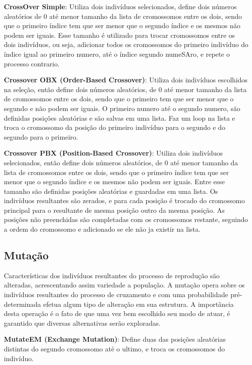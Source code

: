 \textbf{CrossOver Simple}: Utiliza dois indivíduos selecionados,  define dois números aleatórios de 0 até menor tamanho da lista de cromossomos entre os dois, 
sendo que o primeiro índice tem que ser menor que o segundo índice e os mesmos não podem ser iguais. 
Esse tamanho é utilizado para trocar cromossomos entre os dois indivíduos, ou seja, adicionar todos os cromossomos do primeiro indivíduo do índice 
igual ao primeiro numero, até o índice segundo numeSAro, e repete o processo contrario.

\textbf{Crossover OBX (Order-Based Crossover)}: Utiliza dois indivíduos escolhidos na seleção, então define dois números aleatórios, de 0 até menor tamanho da lista de cromossomos entre os dois, sendo que o primeiro tem que ser menor que o segundo e não podem ser iguais. O primeiro numero até o segundo numero, são definidas posições aleatórias e são salvas em uma lista. Faz um loop na lista e troca o cromossomo da posição do primeiro indivíduo para o segundo e do segundo para o primeiro.

\textbf{Crossover PBX (Position-Based Crossover)}: Utiliza dois indivíduos selecionados, então define dois números aleatórios, 
de 0 até menor tamanho da lista de cromossomos entre os dois, sendo que o primeiro índice tem que ser menor que o segundo índice e os mesmos não podem ser iguais. 
Entre esse tamanho são definidas posições aleatórias e guardadas em uma lista. Os indivíduos resultantes são zerados, 
e para cada posição é trocado do cromossomo principal para o resultante de mesma posição outro da mesma posição. 
As posições não preenchidas são completadas com os cromossomos restante, seguindo a ordem do cromossomo e adicionado se ele não ja existir na lista.

\subsection{Mutação}
Características dos indivíduos resultantes do processo de reprodução são alteradas, acrescentando assim variedade a população.
A mutação opera sobre os indivíduos resultantes do processo de cruzamento e com uma probabilidade pré-determinada efetua algum tipo de alteração em sua  estrutura. A importância desta operação é o fato de que uma vez bem escolhido seu modo de atuar, é garantido que diversas alternativas serão exploradas.

\textbf{MutateEM (Exchange Mutation)}: Define duas das posições aleatórias distintas do segundo cromossomo até o ultimo, e troca os cromossomos do indivíduo.

